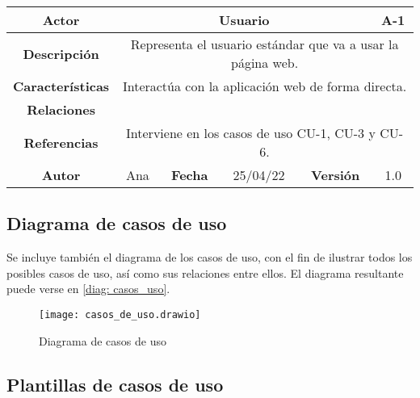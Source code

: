 \begin{table}[!h]
\begin{tabular}{|c|c|c|c|c|c|c|c|}
\hline
 \rowcolor{azulillo} \textbf{Actor} & \multicolumn{6}{|c|}{Usuario} & {A-1} \\
\hline
 \cellcolor{azulillo} \textbf{Descripción}              & \multicolumn{7}{|c|}{Representa el usuario estándar que va a usar la página web.}           \\
\hline
 \cellcolor{azulillo} \textbf{Características}                 & \multicolumn{7}{|c|}{Interactúa con la aplicación web de forma directa.}             \\
\hline
 \cellcolor{azulillo} \textbf{Relaciones}         & \multicolumn{7}{|c|}{}             \\
\hline
\cellcolor{azulillo} \textbf{Referencias}        & \multicolumn{7}{|c|}{Interviene en los casos de uso CU-1, CU-3 y CU-6.}              \\
\hline
\cellcolor{azulillo} \textbf{Autor}                &   Ana  & \multicolumn{2}{|c|}{\cellcolor{azulillo} \textbf{Fecha}} &  25/04/22   & \multicolumn{2}{|c|}{\cellcolor{azulillo} \textbf{Versión}} & 1.0  \\
\hline
\end{tabular}
\end{table}

\subsection{Diagrama de casos de uso}

Se incluye también el diagrama de los casos de uso, con el fin de ilustrar todos los posibles casos de uso, así como sus relaciones entre ellos. El diagrama resultante puede verse en \eqref{diag: casos_uso}.

\begin{figure}[!h]
\begin{center}
\caption{Diagrama de casos de uso}
\label{diag: casos_uso}
\texttt{[image: casos\_de\_uso.drawio]}
\end{center}
\end{figure}



\clearpage

\subsection{Plantillas de casos de uso}




